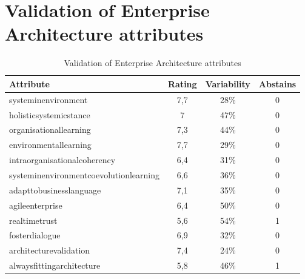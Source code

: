 \section{Validation of Enterprise Architecture attributes}
\label{sec:validationofeaattributes}
\begin{table}[H]
	\centering
	\begin{tabular}{p{}ccc}
		\toprule
		\textbf{Attribute} & \textbf{Rating} & \textbf{Variability} & \textbf{Abstains} \\
		\midrule
		\Gls{systeminenvironment} & 7,7 & 28\% & 0 \\%
		\Gls{holisticsystemicstance} & 7 & 47\% & 0 \\%
		\Gls{organisationallearning} & 7,3 & 44\% & 0 \\%
		\Gls{environmentallearning} & 7,7 & 29\% & 0 \\%
		\Gls{intraorganisationalcoherency} & 6,4 & 31\% & 0 \\%
		\Gls{systeminenvironmentcoevolutionlearning} & 6,6 & 36\% & 0 \\%
		\Gls{adapttobusinesslanguage} & 7,1 & 35\% & 0 \\%
		\Gls{agileenterprise} & 6,4 & 50\% & 0 \\%
		\Gls{realtimetrust} & 5,6 & 54\% & 1 \\%
		\Gls{fosterdialogue} & 6,9 & 32\% & 0 \\%
		\Gls{architecturevalidation} & 7,4 & 24\% & 0 \\%
		\Gls{alwaysfittingarchitecture} & 5,8 & 46\% & 1 \\%
		\bottomrule
	\end{tabular}%
	\caption{Validation of Enterprise Architecture attributes}
	\label{tab:appvalidationofeaattributes}%
\end{table}%
\newpage

